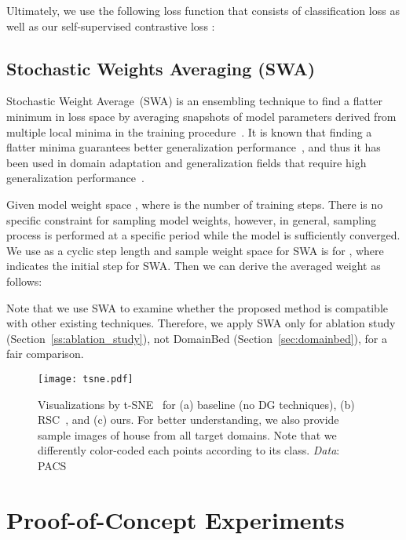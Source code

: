 \documentclass[10pt,twocolumn,letterpaper]{article}
\newcommand{\myparagraph}[1]{\vspace{4pt}\noindent{\bf #1}}
\begin{document}
\myparagraph{Loss Function}
Ultimately, we use the following loss function  that consists of classification loss  as well as our self-supervised contrastive loss :


\subsection{Stochastic Weights Averaging (SWA)}\label{ss:swa}
Stochastic Weight Average~(SWA) is an ensembling technique to find a flatter minimum in loss space by averaging snapshots of model parameters derived from multiple local minima in the training procedure~\cite{izmailov2018averaging}. It is known that finding a flatter minima guarantees better generalization performance~\cite{he2019asymmetric}, and thus it has been used in domain adaptation and generalization fields that require high generalization performance~\cite{zhao2019learning, cha2021domain}.

Given model weight space , where  is the number of training steps. There is no specific constraint for sampling model weights, however, in general, sampling process is performed at a specific period while the model is sufficiently converged. We use  as a cyclic step length and sample weight space for SWA is  for , where  indicates the initial step for SWA. Then we can derive the averaged weight  as follows:

Note that we use SWA to examine whether the proposed method is compatible with other existing techniques. Therefore, we apply SWA only for ablation study (Section~\ref{ss:ablation_study}), not DomainBed (Section~\ref{sec:domainbed}), for a fair comparison.


\begin{figure*}[t]
\begin{center}
   \texttt{[image: tsne.pdf]}
\end{center}
   \caption{Visualizations by t-SNE~\cite{van2008visualizing} for (a) baseline (no DG techniques), (b) RSC~\cite{huangRSC2020}, and (c) ours. For better understanding, we also provide sample images of house from all target domains. Note that we differently color-coded each points according to its class. {\textit{Data}}: PACS~\cite{Li2017dg}}
\label{fig:tsne}
\end{figure*}

\section{Proof-of-Concept Experiments}
\end{document}
